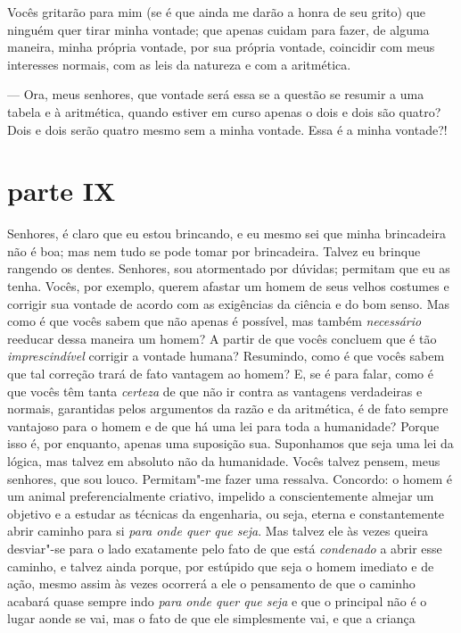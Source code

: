 Vocês gritarão para mim (se é que ainda me darão a honra de seu grito)
que ninguém quer tirar minha vontade; que apenas cuidam para fazer, de
alguma maneira, minha própria vontade, por sua própria vontade,
coincidir com meus interesses normais, com as leis da natureza e com a
aritmética.

--- Ora, meus senhores, que vontade será essa se a questão se resumir a
uma tabela e à aritmética, quando estiver em curso apenas o dois e dois
são quatro? Dois e dois serão quatro mesmo sem a minha vontade. Essa é
a minha vontade?!


\section{parte IX}

Senhores, é claro que eu estou brincando, e eu mesmo sei que minha brincadeira
não é boa; mas nem tudo se pode tomar por brincadeira.  Talvez eu brinque
rangendo os dentes. Senhores, sou atormentado por dúvidas; permitam que eu as
tenha. Vocês, por exemplo, querem afastar um homem de seus velhos costumes e
corrigir sua vontade de acordo com as exigências da ciência e do bom senso. Mas
como é que vocês sabem que não apenas é possível, mas também
\textit{necessário} reeducar dessa maneira um homem? A partir de que vocês
concluem que é tão \textit{imprescindível} corrigir a vontade humana?
Resumindo, como é que vocês sabem que tal correção trará de fato vantagem ao
homem? E, se é para falar, como é que vocês têm tanta \textit{certeza} de que
não ir contra as vantagens verdadeiras e normais, garantidas pelos argumentos
da razão e da aritmética, é de fato sempre vantajoso para o homem e de que há
uma lei para toda a humanidade? Porque isso é, por enquanto, apenas uma
suposição sua. Suponhamos que seja uma lei da lógica, mas talvez em absoluto
não da humanidade. Vocês talvez pensem, meus senhores, que sou louco.
Permitam"-me fazer uma ressalva. Concordo: o homem é um animal preferencialmente
criativo, impelido a conscientemente almejar um objetivo e a estudar as
técnicas da engenharia, ou seja, eterna e constantemente abrir caminho para si
\textit{para onde quer que seja}. Mas talvez ele às vezes queira desviar"-se
para o lado exatamente pelo fato de que está \textit{condenado} a abrir esse
caminho, e talvez ainda porque, por estúpido que seja o homem imediato e de
ação, mesmo assim às vezes ocorrerá a ele o pensamento de que o caminho acabará
quase sempre indo \textit{para onde quer que seja} e que o principal não é o
lugar aonde se vai, mas o fato de que ele simplesmente vai, e que a criança
